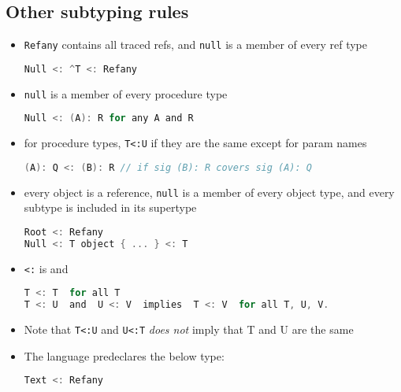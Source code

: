 \documentclass[10pt,a4paper,landscape]{article}
\begin{document}
\begin{multicols*}{3}
\section*{Other subtyping rules}
\begin{itemize}
\item \texttt{Refany} contains all traced refs, and \texttt{null} is a member of every ref type
\begin{lstlisting}[language=c]
Null <: ^T <: Refany
\end{lstlisting}
\item \texttt{null} is a member of every procedure type
\begin{lstlisting}[language=c]
Null <: (A): R for any A and R
\end{lstlisting}
\item for procedure types, \texttt{T<:U} if they are the same except for param names
\begin{lstlisting}[language=c]
(A): Q <: (B): R // if sig (B): R covers sig (A): Q
\end{lstlisting}
\item every object is a reference, \texttt{null} is a member of every object type, and every subtype is included in its supertype
\begin{lstlisting}[language=c]
Root <: Refany
Null <: T object { ... } <: T
\end{lstlisting}
\item \texttt{<:} is  and 
\begin{lstlisting}[language=c]
T <: T  for all T
T <: U  and  U <: V  implies  T <: V  for all T, U, V.
\end{lstlisting}
\item Note that \texttt{T<:U} and \texttt{U<:T} \emph{does not} imply that T and U are the same
\item The language predeclares the below type:
\begin{lstlisting}[language=c]
Text <: Refany
\end{lstlisting}
\end{itemize}

\end{multicols*}
\end{document}
